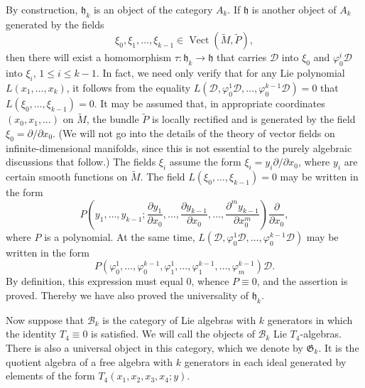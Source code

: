 \documentclass[a4paper]{article}
\newcommand{\Vect}{\operatorname{Vect}}
\begin{document}
By construction, $\mathfrak{h}_k$ is an object of the category $A_k$.
If $\mathfrak{h}$ is another object of $A_k$ generated by the fields
\begin{equation*}
	\xi_0,\xi_1,\dotsc,\xi_{k-1}\in \Vect(\tilde{M},\tilde{P}),   
\end{equation*}
then there will exist a homomorphism $\tau : \mathfrak{h}_k \to \mathfrak{h}$ that carries $\mathscr{D}$ into $\xi_0$ and $\varphi_0^i \mathscr{D}$ into $\xi_i$, $1 \leq i \leq k-1$.
In fact, we need only verify that for any Lie polynomial $L(x_1,\dotsc,x_k)$, it follows from the equality $L(\mathscr{D},\varphi_0^1 \mathscr{D}, \dotsc, \varphi_0^{k-1}\mathscr{D}) = 0$ that $L(\xi_0,\dotsc,\xi_{k-1}) = 0$.
It may be assumed that, in appropriate coordinates $(x_0,x_1,\dotsc)$ on $\tilde{M}$, the bundle $\tilde{P}$ is locally rectified and is generated by the field $\xi_0 = \partial/{\partial x_0}$.
(We will not go into the details of the theory of vector fields on infinite-dimensional manifolds, since this is not essential to the purely algebraic discussions that follow.)
The fields $\xi_i$ assume the form $\xi_i = y_i \partial / \partial x_0$, where $y_i$ are certain smooth functions on $\tilde{M}$.
The field $L(\xi_0,\dotsc, \xi_{k-1}) = 0$ may be written in the form
\begin{equation*}
	P\left(y_1,\dotsc,y_{k-1};\frac{\partial y_1}{\partial x_0}, \dotsc, \frac{\partial y_{k-1}}{\partial x_0}, \dotsc, \frac{\partial^m y_{k-1}}{\partial x_0^m} \right) \frac{\partial}{\partial x_0},
\end{equation*}
where $P$ is a polynomial.
At the same time, $L(\mathscr{D},\varphi_0^1\mathscr{D}, \dotsc, \varphi_0^{k-1}\mathscr{D})$ may be written in the form
\begin{equation*}
	P(\varphi_0^1, \dotsc, \varphi_0^{k-1}, \varphi_1^1, \dotsc, \varphi_1^{k-1}, \dotsc, \varphi_m^{k-1}) \mathscr{D}.
\end{equation*}
By definition, this expression must equal $0$, whence $P \equiv 0$, and the assertion is proved.
Thereby we have also proved the universality of $\mathfrak{h}_k$.

Now suppose that $\mathscr{B}_k$ is the category of Lie algebras with $k$ generators in which the identity $T_4 \equiv 0$ is satisfied.
We will call the objects of $\mathscr{B}_k$ Lie $T_4$-algebras.
There is also a universal object in this category, which we denote by $\mathfrak{G}_k$.
It is the quotient algebra of a free algebra with $k$ generators in each ideal generated by elements of the form $T_4(x_1,x_2,x_3,x_4;y)$.
\end{document}

